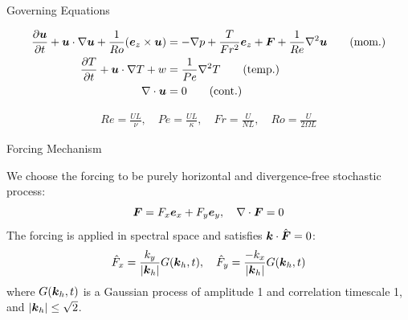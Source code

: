 \documentclass[aspecttatio=169]{beamer}
\begin{document}
\begin{frame}{Governing Equations}

    {\small
    \begin{align}
        \frac{\partial \boldsymbol{u}}{\partial t} + \boldsymbol{u} \cdot \nabla \boldsymbol{u} +
        \frac{1}{Ro}(\boldsymbol{e}_z \times
        \boldsymbol{u}) &= -\nabla p +
        \frac{T}{Fr^2}\boldsymbol{e}_z + \boldsymbol{F} + \frac{1}{Re}\nabla^2\boldsymbol{u} \tag{mom.}\label{eq:momentum}\\
        \frac{\partial T}{\partial t} + \boldsymbol{u} \cdot \nabla T + w &= \frac{1}{Pe}\nabla^2T \tag{temp.} \label{eq:temp} \\
        \nabla \cdot \boldsymbol{u} &= 0 \tag{cont.}\label{eq:cont}
    \end{align}
    
    \begin{align*}
        Re = \frac{UL}{\nu}, \quad Pe = \frac{UL}{\kappa}, \quad Fr =
        \frac{U}{NL}, \quad Ro = \frac{U}{2\Omega L}
    \end{align*}
    }

\end{frame}

\begin{frame}{Forcing Mechanism}

    We choose the forcing to be purely horizontal and divergence-free stochastic
    process:
    \[
        \boldsymbol{F} = F_x\boldsymbol{e}_x + F_y\boldsymbol{e}_y, \quad \nabla \cdot \boldsymbol{F} = 0
    \]
    The forcing is applied in spectral space and satisfies $\boldsymbol{k} \cdot \hat{\boldsymbol{F}} = 0$:
    \begin{gather*}
        \hat{F}_x = \frac{k_y}{|\boldsymbol{k}_h|}G(\boldsymbol{k}_h,t), \quad \hat{F}_y = \frac{-k_x}{|\boldsymbol{k}_h|}G(\boldsymbol{k}_h,t)\\
    \end{gather*}
    where $G(\boldsymbol{k}_h,t)$ is a Gaussian process of amplitude 1 and correlation
    timescale 1, and $|\boldsymbol{k}_h| \le \sqrt{2}$. 


\end{frame}
\end{document}
